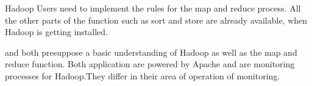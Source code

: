 Hadoop Users need to implement the rules for the map and reduce process. All the other parts of the function such as sort and store are already available, when Hadoop is getting installed.\cite{Dagli2014}


\amb and \chuk both presuppose a basic understanding of Hadoop as well as the map and reduce function. Both application are powered by Apache and are monitoring processes for Hadoop.They differ in their area of operation of monitoring.\cite{ApacheSoftwareFoundation2015}